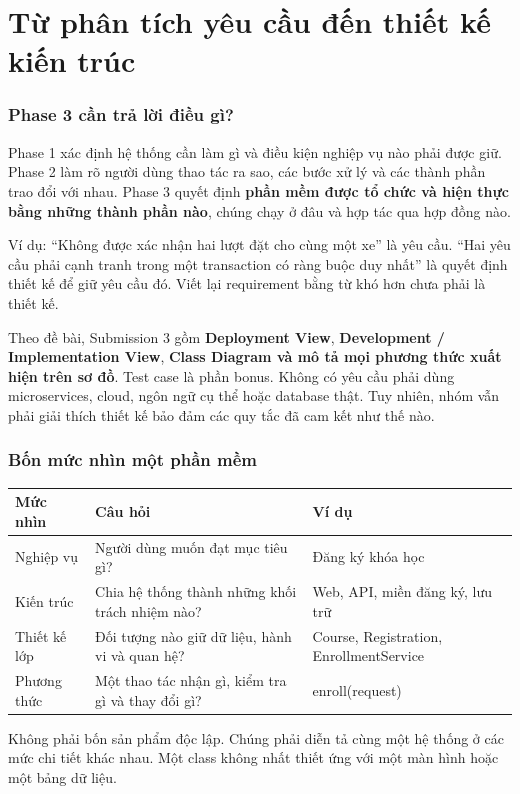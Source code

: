 \chapter{Từ phân tích yêu cầu đến thiết kế kiến trúc}
\subsection{Phase 3 cần trả lời điều gì?}
Phase 1 xác định hệ thống cần làm gì và điều kiện nghiệp vụ nào phải được giữ. Phase 2 làm rõ người dùng thao tác ra sao, các bước xử lý và các thành phần trao đổi với nhau. Phase 3 quyết định \textbf{phần mềm được tổ chức và hiện thực bằng những thành phần nào}, chúng chạy ở đâu và hợp tác qua hợp đồng nào.

Ví dụ: ``Không được xác nhận hai lượt đặt cho cùng một xe'' là yêu cầu. ``Hai yêu cầu phải cạnh tranh trong một transaction có ràng buộc duy nhất'' là quyết định thiết kế để giữ yêu cầu đó. Viết lại requirement bằng từ khó hơn chưa phải là thiết kế.

Theo đề bài, Submission 3 gồm \textbf{Deployment View}, \textbf{Development / Implementation View}, \textbf{Class Diagram và mô tả mọi phương thức xuất hiện trên sơ đồ}. Test case là phần bonus. Không có yêu cầu phải dùng microservices, cloud, ngôn ngữ cụ thể hoặc database thật. Tuy nhiên, nhóm vẫn phải giải thích thiết kế bảo đảm các quy tắc đã cam kết như thế nào.

\subsection{Bốn mức nhìn một phần mềm}
\begin{center}\begin{tabularx}{\linewidth}{|L{29mm}|Y|L{39mm}|}\hline
\textbf{Mức nhìn} & \textbf{Câu hỏi} & \textbf{Ví dụ}\\\hline
Nghiệp vụ & Người dùng muốn đạt mục tiêu gì? & Đăng ký khóa học\\\hline
Kiến trúc & Chia hệ thống thành những khối trách nhiệm nào? & Web, API, miền đăng ký, lưu trữ\\\hline
Thiết kế lớp & Đối tượng nào giữ dữ liệu, hành vi và quan hệ? & Course, Registration, EnrollmentService\\\hline
Phương thức & Một thao tác nhận gì, kiểm tra gì và thay đổi gì? & enroll(request)\\\hline
\end{tabularx}\end{center}
Không phải bốn sản phẩm độc lập. Chúng phải diễn tả cùng một hệ thống ở các mức chi tiết khác nhau. Một class không nhất thiết ứng với một màn hình hoặc một bảng dữ liệu.

